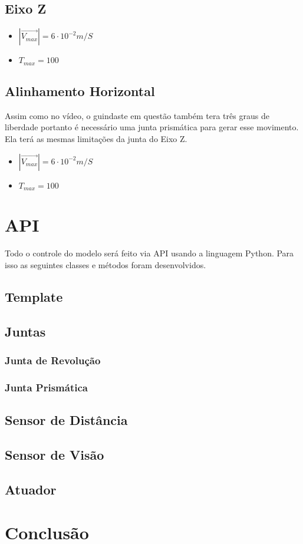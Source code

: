 \documentclass[letterpaper, 10 pt]{ieeeconf}  %
\begin{document}
        \subsection{Eixo Z}
            \begin{itemize}
                \item \(\left|\vec{V_{max}}\right| = 6\cdot 10^{-2} m/S\)
                \item \(T_{max} = 100\)
            \end{itemize}
        \subsection{Alinhamento Horizontal}
            Assim como no vídeo, o guindaste em questão também tera três graus de liberdade portanto é necessário uma junta 
            prismática para gerar esse movimento. Ela terá as mesmas limitações da junta do Eixo Z.
            \begin{itemize}
                \item \(\left|\vec{V_{max}}\right| = 6\cdot 10^{-2} m/S\)
                \item \(T_{max} = 100\)
            \end{itemize}
    \section{API}
        Todo o controle do modelo será feito via API usando a linguagem Python. Para isso as seguintes classes e métodos foram desenvolvidos. 
        \subsection{Template}

        \subsection{Juntas}

        \subsubsection{Junta de Revolução}

        \subsubsection{Junta Prismática}

        \subsection{Sensor de Distância}

        \subsection{Sensor de Visão}

        \subsection{Atuador}
    
    \section{Conclusão}
\thispagestyle{empty}
\pagestyle{empty}
\end{document}
